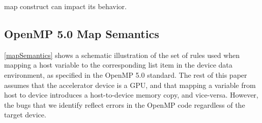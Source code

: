 map construct can impact its behavior.
% 
\subsection{OpenMP 5.0 Map Semantics}
\autoref{mapSemantics} shows a schematic illustration 
of the set of rules used when mapping 
a host variable to the corresponding list item 
in the device data environment, as specified 
in the OpenMP 5.0 standard. The rest of this paper 
 assumes that the accelerator device is a GPU, and that mapping 
a variable from host to device introduces a host-to-device memory copy, 
and vice-versa. 
However, the bugs that we identify reflect errors in the OpenMP 
code regardless of the target device. 

